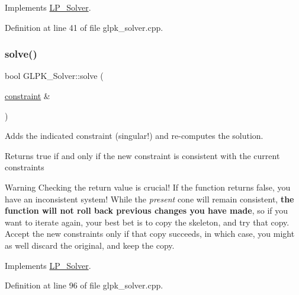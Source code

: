 Implements \hyperlink{class_l_p___solver_a442ad4ad67ee2feff0df49e9201d61ca}{L\+P\+\_\+\+Solver}.



Definition at line 41 of file glpk\+\_\+solver.\+cpp.

\mbox{\label{class_g_l_p_k___solver_acb3a10f3961c65b4cf23ff61f0e2310b}} 
\subsubsection{\texorpdfstring{solve()}{solve()}\hspace{0.1cm}{\footnotesize\ttfamily [1/2]}}
{\footnotesize\ttfamily bool G\+L\+P\+K\+\_\+\+Solver\+::solve (\begin{DoxyParamCaption}\item[{\hyperlink{classconstraint}{constraint} \&}]{ }\end{DoxyParamCaption})\hspace{0.3cm}{\ttfamily [virtual]}}



Adds the indicated constraint (singular!) and re-\/computes the solution. 

\begin{DoxyReturn}{Returns}
{\ttfamily true} if and only if the new constraint is consistent with the current constraints
\end{DoxyReturn}
\begin{DoxyWarning}{Warning}
Checking the return value is crucial! If the function returns {\ttfamily false}, you have an inconsistent system! While the {\itshape present} cone will remain consistent, {\bfseries the function will not roll back previous changes you have made}, so if you want to iterate again, your best bet is to copy the skeleton, and try that copy. Accept the new constraints only if that copy succeeds, in which case, you might as well discard the original, and keep the copy. 
\end{DoxyWarning}


Implements \hyperlink{class_l_p___solver_abd84374c52124116becc8924dc74e12d}{L\+P\+\_\+\+Solver}.



Definition at line 96 of file glpk\+\_\+solver.\+cpp.

\mbox{\label{class_g_l_p_k___solver_a6d800f0ec270c782e3cf855aa7f59f4c}} 
